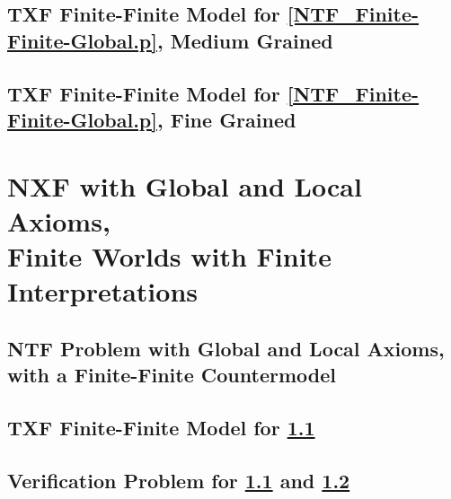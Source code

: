 \documentclass{easychair}
\begin{document}
\newpage
\subsection{TXF Finite-Finite Model for \ref{NTF_Finite-Finite-Global.p}, Medium Grained}
\label{NTF_Finite-Finite-Global_Medium.s}
\begin{small}

\end{small}

\newpage
\subsection{TXF Finite-Finite Model for \ref{NTF_Finite-Finite-Global.p}, Fine Grained}
\label{NTF_Finite-Finite-Global_Fine.s}
\begin{small}

\end{small}

\newpage
\section{NXF with Global and Local Axioms, \\
         Finite Worlds with Finite Interpretations}
\label{NXFLocal}

\subsection{NTF Problem with Global and Local Axioms, \\
            with a Finite-Finite Countermodel}
\label{NTF_Finite-Finite-Local.p}
\begin{small}

\end{small}

\newpage
\subsection{TXF Finite-Finite Model for \ref{NTF_Finite-Finite-Local.p}}
\label{NTF_Finite-Finite-Local.s}
\begin{small}

\end{small}

\newpage
\subsection{Verification Problem for \ref{NTF_Finite-Finite-Local.p} and
\ref{NTF_Finite-Finite-Local.s}}
\label{NTF_Finite-Finite-Local.s.p}
\begin{small}

\end{small}

\end{document}
